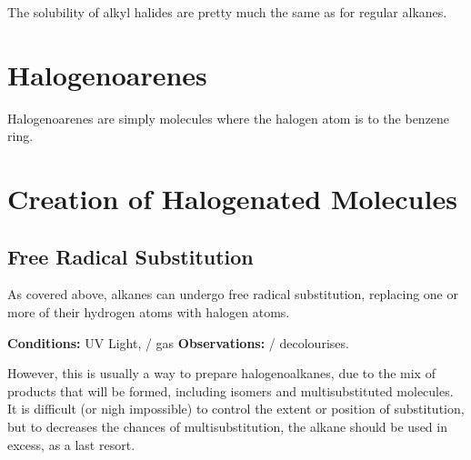 			The solubility of alkyl halides are pretty much the same as for regular alkanes.



	\pagebreak
	\section{Halogenoarenes}

		Halogenoarenes are simply molecules where the halogen atom is  to the benzene ring.





	\section{Creation of Halogenated Molecules}

		\subsection{Free Radical Substitution}

			As covered above, alkanes can undergo free radical substitution, replacing one or more of their hydrogen atoms with halogen
			atoms.

			\vspace{1.5em}

			\vbox{\textbf{Conditions:} \tabto{35mm}UV Light,  /  gas}
			\vbox{\textbf{Observations:} \tabto{35mm}  /   decolourises.}


			However, this is usually a  way to prepare halogenoalkanes, due to the mix of products that will be formed, including
			isomers and multisubstituted molecules. It is difficult (or nigh impossible) to control the extent or position of substitution,
			but to decreases the chances of multisubstitution, the alkane should be used in excess, as a last resort.

